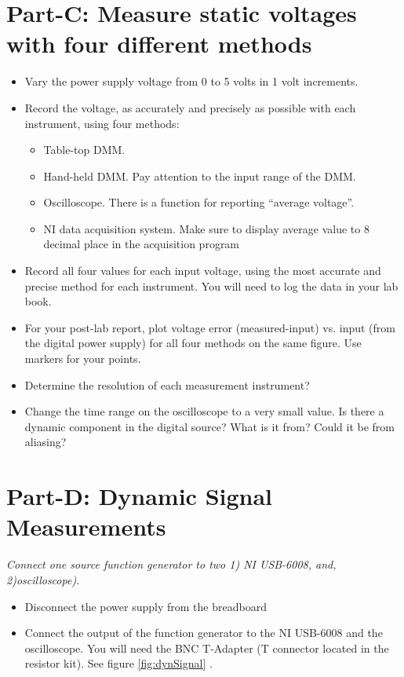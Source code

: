 \documentclass{article} %
\begin{document}
\section{Part-C: Measure static voltages with four different methods}
\begin{itemize}
\item Vary the power supply voltage from 0 to 5 volts in 1 volt increments.
\item Record the voltage, as accurately and precisely as possible with each instrument, using four methods:
\begin{itemize}
\item	Table-top DMM.
\item	Hand-held DMM.  Pay attention to the input range of the DMM.
\item	Oscilloscope. There is a function for reporting ``average voltage''.
\item	NI data acquisition system. Make sure to display average value to 8 decimal place in the acquisition program 
\end{itemize}
\item	Record all four values for each input voltage, using the most accurate and precise method for each instrument. You will need to log the data in your lab book. 
\item	For your post-lab report, plot voltage error (measured-input) vs. input (from the digital power supply) for all four methods on the same figure. Use markers for your points.
\item	Determine the resolution of each measurement instrument?
\item	Change the time range on the oscilloscope to a very small value.  Is there a dynamic component in the digital source?  What is it from?  Could it be from aliasing?
\end{itemize}
\section{Part-D: Dynamic Signal Measurements}
\emph{Connect one source function generator to two 1) NI USB-6008, and, 2)oscilloscope).}
\begin{itemize}
\item Disconnect the power supply from the breadboard
\item Connect the output of the function generator to the NI USB-6008 and the oscilloscope. You will need the BNC T-Adapter (T connector located in the resistor kit).  See figure \ref{fig:dynSignal} .
\end{itemize}
\end{document}
